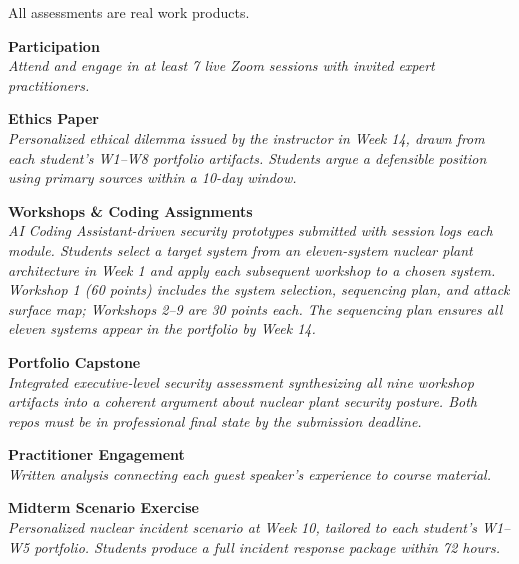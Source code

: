 \documentclass[9pt]{extarticle}
\begin{document}
\begin{minipage}[t]{0.50\textwidth}
\vspace{0pt}\raggedright
All assessments are real work products.

\medskip

\textbf{Participation} \\
\textit{Attend and engage in at least 7 live Zoom sessions with invited expert practitioners.}

\smallskip
\textbf{Ethics Paper} \\
\textit{Personalized ethical dilemma issued by the instructor in Week 14, drawn from each
student's W1--W8 portfolio artifacts. Students argue a defensible position using primary
sources within a 10-day window.}

\smallskip
\textbf{Workshops \& Coding Assignments} \\
\textit{AI Coding Assistant-driven security prototypes submitted with session logs each module.
Students select a target system from an eleven-system nuclear plant architecture in Week 1
and apply each subsequent workshop to a chosen system. Workshop 1 (60 points) includes
the system selection, sequencing plan, and attack surface map; Workshops 2--9 are 30 points each.
The sequencing plan ensures all eleven systems appear in the portfolio by Week 14.}

\smallskip
\textbf{Portfolio Capstone} \\
\textit{Integrated executive-level security assessment synthesizing all nine workshop artifacts
into a coherent argument about nuclear plant security posture. Both repos must be in
professional final state by the submission deadline.}

\smallskip
\textbf{Practitioner Engagement} \\
\textit{Written analysis connecting each guest speaker's experience to course material.}

\smallskip
\textbf{Midterm Scenario Exercise} \\
\textit{Personalized nuclear incident scenario at Week 10, tailored to each student's W1--W5
portfolio. Students produce a full incident response package within 72 hours.}
\end{minipage}%
\hfill
\end{document}
